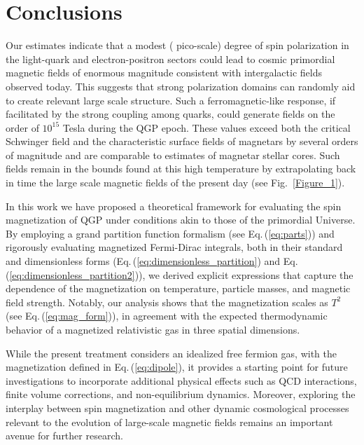 \documentclass[epjST]{svjour}
\newcommand{\req}[1]{Eq.\,(\ref{#1})}
\newcommand{\xblue}[1]{{\color{blue}{#1}}}
\begin{document}
\section{Conclusions}
\label{sec:conclusions}
Our estimates indicate that a modest (\xblue{1 in $10^{12}$} pico-scale) degree of spin polarization in the light-quark and electron-positron sectors could lead to cosmic primordial magnetic fields of enormous magnitude consistent with intergalactic fields observed today. This suggests that strong polarization domains can randomly aid to create relevant large scale structure. Such a ferromagnetic-like response, if facilitated by the strong coupling among quarks, could generate fields on the order of \(10^{15}\) Tesla during the QGP epoch. These values exceed both the critical Schwinger field and the characteristic surface fields of magnetars by several orders of magnitude and are comparable to estimates of magnetar stellar cores. Such fields remain in the bounds found at this high temperature by extrapolating back in time the large scale magnetic fields of the present day (see Fig.~\ref{Figure_1}).

In this work we have proposed a theoretical framework for evaluating the spin magnetization of QGP under conditions akin to those of the primordial Universe. By employing a grand partition function formalism (see \req{eq:parts}) and rigorously evaluating magnetized Fermi-Dirac integrals, both in their standard and dimensionless forms (\req{eq:dimensionless_partition} and \req{eq:dimensionless_partition2}), we derived explicit expressions that capture the dependence of the magnetization on temperature, particle masses, and magnetic field strength. Notably, our analysis shows that the magnetization scales as \(T^2\) (see \req{eq:mag_form}), in agreement with the expected thermodynamic behavior of a magnetized relativistic gas in three spatial dimensions.

While the present treatment considers an idealized free fermion gas, with the magnetization defined in \req{eq:dipole}, it provides a starting point for future investigations to incorporate additional physical effects such as QCD interactions, finite volume corrections, and non-equilibrium dynamics. Moreover, exploring the interplay between spin magnetization and other dynamic cosmological processes relevant to the evolution of large-scale magnetic fields remains an important avenue for further research.\\
\end{document}
